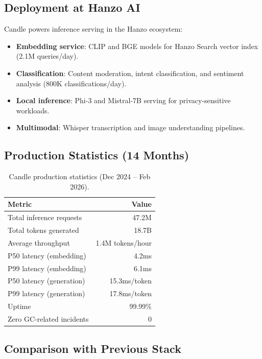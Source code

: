 \documentclass[11pt,twocolumn]{article}
\begin{document}
\subsection{Deployment at Hanzo AI}

Candle powers inference serving in the Hanzo ecosystem:

\begin{itemize}[leftmargin=1.1em]
    \item \textbf{Embedding service}: CLIP and BGE models for Hanzo Search vector index (2.1M queries/day).
    \item \textbf{Classification}: Content moderation, intent classification, and sentiment analysis (800K classifications/day).
    \item \textbf{Local inference}: Phi-3 and Mistral-7B serving for privacy-sensitive workloads.
    \item \textbf{Multimodal}: Whisper transcription and image understanding pipelines.
\end{itemize}

\subsection{Production Statistics (14 Months)}

\begin{table}[H]
\centering
\begin{tabular}{lr}
\toprule
\textbf{Metric} & \textbf{Value} \\
\midrule
Total inference requests & 47.2M \\
Total tokens generated & 18.7B \\
Average throughput & 1.4M tokens/hour \\
P50 latency (embedding) & 4.2ms \\
P99 latency (embedding) & 6.1ms \\
P50 latency (generation) & 15.3ms/token \\
P99 latency (generation) & 17.8ms/token \\
Uptime & 99.99\% \\
Zero GC-related incidents & 0 \\
\bottomrule
\end{tabular}
\caption{Candle production statistics (Dec 2024 -- Feb 2026).}
\label{tab:prod_stats}
\end{table}

\subsection{Comparison with Previous Stack}
\end{document}
